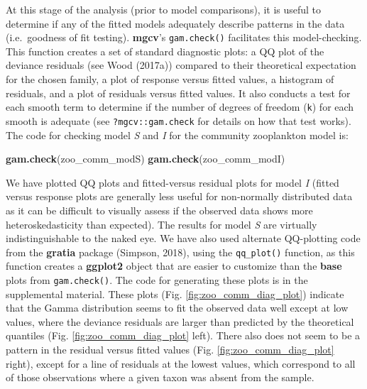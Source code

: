 \documentclass[12pt]{article}
\newenvironment{Shaded}{\begin{snugshade}}{\end{snugshade}}
\newcommand{\KeywordTok}[1]{\textcolor[rgb]{0.13,0.29,0.53}{\textbf{#1}}}
\newcommand{\NormalTok}[1]{#1}
\begin{document}
At this stage of the analysis (prior to model comparisons), it is useful
to determine if any of the fitted models adequately describe patterns in
the data (i.e.~goodness of fit testing). \textbf{mgcv}'s
\texttt{gam.check()} facilitates this model-checking. This function
creates a set of standard diagnostic plots: a QQ plot of the deviance
residuals (see Wood (2017a)) compared to their theoretical expectation
for the chosen family, a plot of response versus fitted values, a
histogram of residuals, and a plot of residuals versus fitted values. It
also conducts a test for each smooth term to determine if the number of
degrees of freedom (\texttt{k}) for each smooth is adequate (see
\texttt{?mgcv::gam.check} for details on how that test works). The code
for checking model \emph{S} and \emph{I} for the community zooplankton
model is:

\begin{Shaded}
\begin{Highlighting}[]
\KeywordTok{gam.check}\NormalTok{(zoo_comm_modS)}
\KeywordTok{gam.check}\NormalTok{(zoo_comm_modI)}
\end{Highlighting}
\end{Shaded}

We have plotted QQ plots and fitted-versus residual plots for model
\emph{I} (fitted versus response plots are generally less useful for
non-normally distributed data as it can be difficult to visually assess
if the observed data shows more heteroskedasticity than expected). The
results for model \emph{S} are virtually indistinguishable to the naked
eye. We have also used alternate QQ-plotting code from the
\textbf{gratia} package (Simpson, 2018), using the \texttt{qq\_plot()}
function, as this function creates a \textbf{ggplot2} object that are
easier to customize than the \textbf{base} plots from
\texttt{gam.check()}. The code for generating these plots is in the
supplemental material. These plots (Fig. \ref{fig:zoo_comm_diag_plot})
indicate that the Gamma distribution seems to fit the observed data well
except at low values, where the deviance residuals are larger than
predicted by the theoretical quantiles (Fig.
\ref{fig:zoo_comm_diag_plot} left). There also does not seem to be a
pattern in the residual versus fitted values (Fig.
\ref{fig:zoo_comm_diag_plot} right), except for a line of residuals at
the lowest values, which correspond to all of those observations where a
given taxon was absent from the sample.
\end{document}
